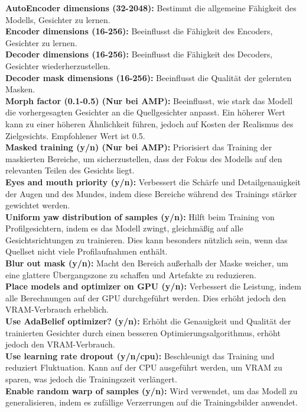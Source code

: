 \textbf{AutoEncoder dimensions (32-2048):} Bestimmt die allgemeine Fähigkeit des Modells, Gesichter zu lernen.\\
\textbf{Encoder dimensions (16-256):} Beeinflusst die Fähigkeit des Encoders, Gesichter zu lernen.\\
\textbf{Decoder dimensions (16-256):} Beeinflusst die Fähigkeit des Decoders, Gesichter wiederherzustellen.\\
\textbf{Decoder mask dimensions (16-256):} Beeinflusst die Qualität der gelernten Masken.\\

\textbf{Morph factor (0.1-0.5) (Nur bei AMP):} Beeinflusst, wie stark das Modell die vorhergesagten Gesichter an die Quellgesichter anpasst.
Ein höherer Wert kann zu einer höheren Ähnlichkeit führen, jedoch auf Kosten der Realismus des Zielgesichts.
Empfohlener Wert ist 0.5.\\
\textbf{Masked training (y/n) (Nur bei AMP):} Priorisiert das Training der maskierten Bereiche, um sicherzustellen, dass der Fokus des Modells auf den relevanten Teilen des Gesichts liegt.\\
\textbf{Eyes and mouth priority (y/n):} Verbessert die Schärfe und Detailgenauigkeit der Augen und des Mundes, indem diese Bereiche während des Trainings stärker gewichtet werden.\\
\textbf{Uniform yaw distribution of samples (y/n):} Hilft beim Training von Profilgesichtern, indem es das Modell zwingt, gleichmäßig auf alle Gesichtsrichtungen zu trainieren.
Dies kann besonders nützlich sein, wenn das Quellset nicht viele Profilaufnahmen enthält.\\
\textbf{Blur out mask (y/n):} Macht den Bereich außerhalb der Maske weicher, um eine glattere Übergangszone zu schaffen und Artefakte zu reduzieren.\\
\textbf{Place models and optimizer on GPU (y/n):} Verbessert die Leistung, indem alle Berechnungen auf der GPU durchgeführt werden.
Dies erhöht jedoch den VRAM-Verbrauch erheblich.\\
\textbf{Use AdaBelief optimizer? (y/n):} Erhöht die Genauigkeit und Qualität der trainierten Gesichter durch einen besseren Optimierungsalgorithmus, erhöht jedoch den VRAM-Verbrauch.\\
\textbf{Use learning rate dropout (y/n/cpu):} Beschleunigt das Training und reduziert Fluktuation.
Kann auf der CPU ausgeführt werden, um VRAM zu sparen, was jedoch die Trainingszeit verlängert.\\
\textbf{Enable random warp of samples (y/n):} Wird verwendet, um das Modell zu generalisieren, indem es zufällige Verzerrungen auf die Trainingsbilder anwendet.\\
